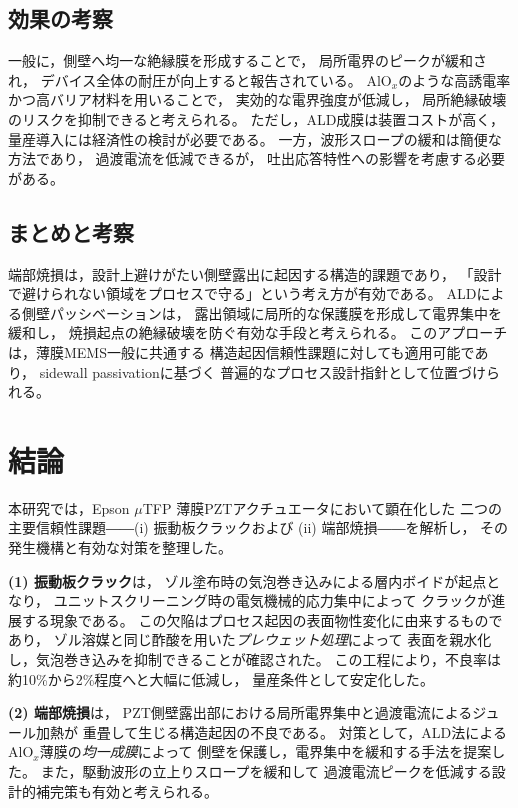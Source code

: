 \documentclass[conference]{IEEEtran}
\begin{document}
\subsection{効果の考察}
一般に，側壁へ均一な絶縁膜を形成することで，
局所電界のピークが緩和され，
デバイス全体の耐圧が向上すると報告されている。
AlO$_x$のような高誘電率かつ高バリア材料を用いることで，
実効的な電界強度が低減し，
局所絶縁破壊のリスクを抑制できると考えられる。
ただし，ALD成膜は装置コストが高く，
量産導入には経済性の検討が必要である。
一方，波形スロープの緩和は簡便な方法であり，
過渡電流を低減できるが，
吐出応答特性への影響を考慮する必要がある。

\subsection{まとめと考察}
端部焼損は，設計上避けがたい側壁露出に起因する構造的課題であり，
「設計で避けられない領域をプロセスで守る」という考え方が有効である。
ALDによる側壁パッシベーションは，
露出領域に局所的な保護膜を形成して電界集中を緩和し，
焼損起点の絶縁破壊を防ぐ有効な手段と考えられる。
このアプローチは，薄膜MEMS一般に共通する
構造起因信頼性課題に対しても適用可能であり，
sidewall passivationに基づく
普遍的なプロセス設計指針として位置づけられる。

\section{結論}
本研究では，Epson $\mu$TFP 薄膜PZTアクチュエータにおいて顕在化した
二つの主要信頼性課題――(i) 振動板クラックおよび (ii) 端部焼損――を解析し，
その発生機構と有効な対策を整理した。

\textbf{(1) 振動板クラック}は，
ゾル塗布時の気泡巻き込みによる層内ボイドが起点となり，
ユニットスクリーニング時の電気機械的応力集中によって
クラックが進展する現象である。
この欠陥はプロセス起因の表面物性変化に由来するものであり，
ゾル溶媒と同じ酢酸を用いた\emph{プレウェット処理}によって
表面を親水化し，気泡巻き込みを抑制できることが確認された。
この工程により，不良率は約10\%から2\%程度へと大幅に低減し，
量産条件として安定化した\cite{Samizo2025}。

\textbf{(2) 端部焼損}は，
PZT側壁露出部における局所電界集中と過渡電流によるジュール加熱が
重畳して生じる構造起因の不良である。
対策として，ALD法によるAlO$_x$薄膜の\emph{均一成膜}によって
側壁を保護し，電界集中を緩和する手法を提案した\cite{TFP2014}。
また，駆動波形の立上りスロープを緩和して
過渡電流ピークを低減する設計的補完策も有効と考えられる。
\end{document}
